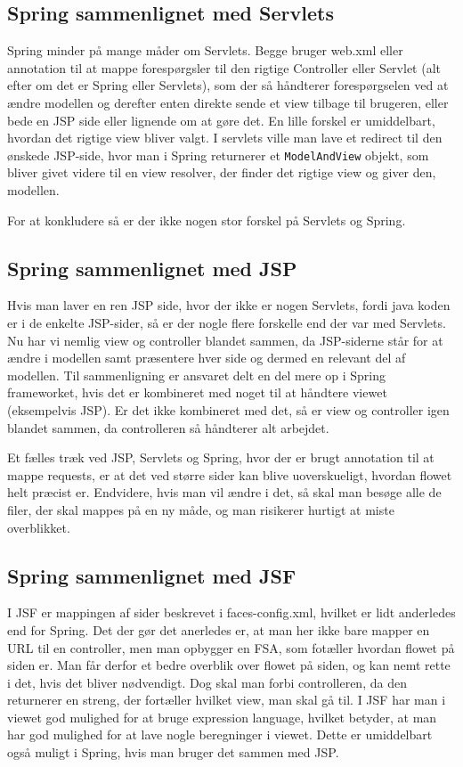 \documentclass[a4paper,10pt]{article}
\begin{document}
\subsection*{Spring sammenlignet med Servlets}
Spring minder på mange måder om Servlets. Begge bruger web.xml eller annotation til at mappe forespørgsler til den rigtige Controller eller Servlet (alt efter om det er Spring eller Servlets), som der så håndterer forespørgselen ved at ændre modellen og derefter enten direkte sende et view tilbage til brugeren, eller bede en JSP side eller lignende om at gøre det. En lille forskel er umiddelbart, hvordan det rigtige view bliver valgt. I servlets ville man lave et redirect til den ønskede JSP-side, hvor man i Spring returnerer et \texttt{ModelAndView} objekt, som bliver givet videre til en view resolver, der finder det rigtige view og giver den, modellen.

For at konkludere så er der ikke nogen stor forskel på Servlets og Spring.

\subsection*{Spring sammenlignet med JSP}
Hvis man laver en ren JSP side, hvor der ikke er nogen Servlets, fordi java koden er i de enkelte JSP-sider, så er der nogle flere forskelle end der var med Servlets. Nu har vi nemlig view og controller blandet sammen, da JSP-siderne står for at ændre i modellen samt præsentere hver side og dermed en relevant del af modellen. Til sammenligning er ansvaret delt en del mere op i Spring frameworket, hvis det er kombineret med noget til at håndtere viewet (eksempelvis JSP). Er det ikke kombineret med det, så er view og controller igen blandet sammen, da controlleren så håndterer alt arbejdet.

Et fælles træk ved JSP, Servlets og Spring, hvor der er brugt annotation til at mappe requests, er at det ved større sider kan blive uoverskueligt, hvordan flowet helt præcist er. Endvidere, hvis man vil ændre i det, så skal man besøge alle de filer, der skal mappes på en ny måde, og man risikerer hurtigt at miste overblikket.


\subsection*{Spring sammenlignet med JSF}
I JSF er mappingen af sider beskrevet i faces-config.xml, hvilket er lidt anderledes end for Spring. Det der gør det anerledes er, at man her ikke bare mapper en URL til en controller, men man opbygger en FSA, som fotæller hvordan flowet på siden er. Man får derfor et bedre overblik over flowet på siden, og kan nemt rette i det, hvis det bliver nødvendigt. Dog skal man forbi controlleren, da den returnerer en streng, der fortæller hvilket view, man skal gå til. I JSF har man i viewet god mulighed for at bruge expression language, hvilket betyder, at man har god mulighed for at lave nogle beregninger i viewet. Dette er umiddelbart også muligt i Spring, hvis man bruger det sammen med JSP.
\end{document}
